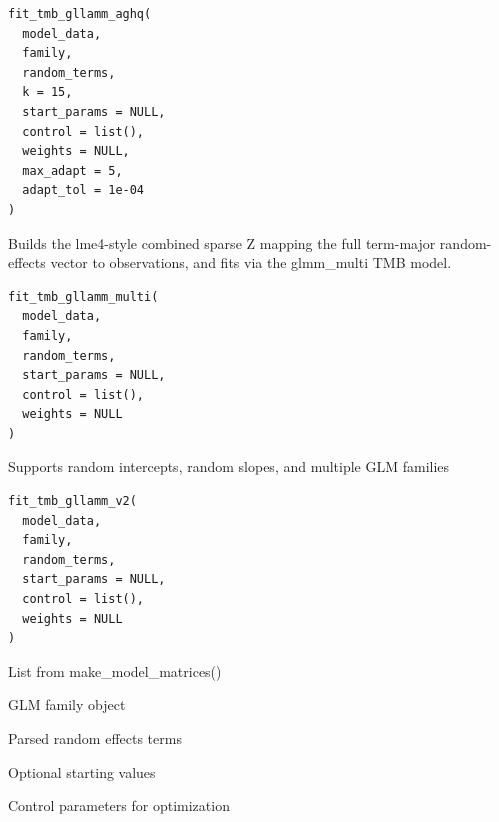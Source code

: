 \documentclass[a4paper]{book}
\begin{document}
%
\begin{Usage}
\begin{verbatim}
fit_tmb_gllamm_aghq(
  model_data,
  family,
  random_terms,
  k = 15,
  start_params = NULL,
  control = list(),
  weights = NULL,
  max_adapt = 5,
  adapt_tol = 1e-04
)
\end{verbatim}
\end{Usage}
%
\begin{Description}
Builds the lme4-style combined sparse Z mapping the full term-major
random-effects vector to observations, and fits via the glmm\_multi
TMB model.
\end{Description}
%
\begin{Usage}
\begin{verbatim}
fit_tmb_gllamm_multi(
  model_data,
  family,
  random_terms,
  start_params = NULL,
  control = list(),
  weights = NULL
)
\end{verbatim}
\end{Usage}
%
\begin{Description}
Supports random intercepts, random slopes, and multiple GLM families
\end{Description}
%
\begin{Usage}
\begin{verbatim}
fit_tmb_gllamm_v2(
  model_data,
  family,
  random_terms,
  start_params = NULL,
  control = list(),
  weights = NULL
)
\end{verbatim}
\end{Usage}
%
\begin{Arguments}
\begin{ldescription}
\item[\code{model\_data}] List from make\_model\_matrices()

\item[\code{family}] GLM family object

\item[\code{random\_terms}] Parsed random effects terms

\item[\code{start\_params}] Optional starting values

\item[\code{control}] Control parameters for optimization
\end{ldescription}
\end{Arguments}
\end{document}

